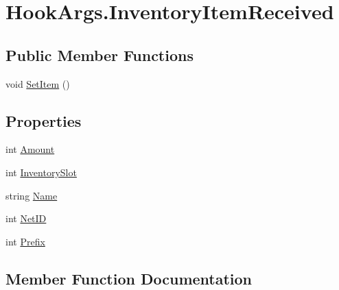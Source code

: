 \hypertarget{structOTA_1_1Plugin_1_1HookArgs_1_1InventoryItemReceived}{}\section{Hook\+Args.\+Inventory\+Item\+Received}
\label{structOTA_1_1Plugin_1_1HookArgs_1_1InventoryItemReceived}
\subsection*{Public Member Functions}
\begin{DoxyCompactItemize}
\item 
void \hyperlink{structOTA_1_1Plugin_1_1HookArgs_1_1InventoryItemReceived_a4610757bbdf10b275bf7add4b04549cf}{Set\+Item} ()
\end{DoxyCompactItemize}
\subsection*{Properties}
\begin{DoxyCompactItemize}
\item 
int \hyperlink{structOTA_1_1Plugin_1_1HookArgs_1_1InventoryItemReceived_a86eee4fff35119212eb3f7309c752a34}{Amount}
\item 
int \hyperlink{structOTA_1_1Plugin_1_1HookArgs_1_1InventoryItemReceived_a63cfd11220d8defcd59e600c500d6037}{Inventory\+Slot}
\item 
string \hyperlink{structOTA_1_1Plugin_1_1HookArgs_1_1InventoryItemReceived_a7ee9065718e6628dc7791b756fa6c0f9}{Name}
\item 
int \hyperlink{structOTA_1_1Plugin_1_1HookArgs_1_1InventoryItemReceived_a695a967c8b6970a86a81a4b21b2b2666}{Net\+I\+D}
\item 
int \hyperlink{structOTA_1_1Plugin_1_1HookArgs_1_1InventoryItemReceived_a4af97a82af468fae09544a1a59762add}{Prefix}
\end{DoxyCompactItemize}


\subsection{Member Function Documentation}
\hypertarget{structOTA_1_1Plugin_1_1HookArgs_1_1InventoryItemReceived_a4610757bbdf10b275bf7add4b04549cf}{}
